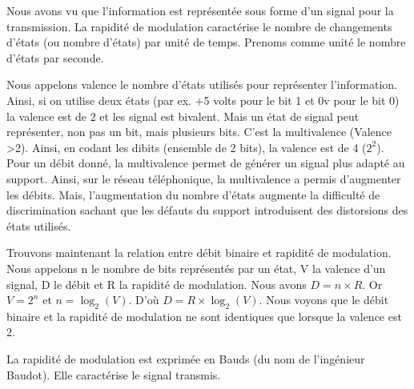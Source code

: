 Nous avons vu que l'information est représentée sous forme d'un signal pour la transmission.
La rapidité de modulation caractérise le nombre de changements d'états (ou nombre d'états) par
unité de temps. Prenoms comme unité le nombre d'états par seconde.

Nous appelons valence le nombre d'états utilisés pour représenter l'information. Ainsi, si on
utilise deux états (par ex. +5 volts pour le bit 1 et 0v pour le bit 0) la valence est de 2 et
les signal est bivalent. Mais un état de signal peut représenter, non pas un bit, mais
plusieurs bits. C'est la multivalence (Valence >2). Ainsi, en codant les dibits (ensemble de 2
bits), la valence est de 4 ($2^2$). Pour un débit donné, la multivalence permet de générer un
signal plus adapté au support. Ainsi, sur le réseau téléphonique, la multivalence a permis
d'augmenter les débits. Mais, l'augmentation du nombre d'états augmente la difficulté de
discrimination sachant que les défauts du support introduisent des distorsions des états
utilisés.

Trouvons maintenant la relation entre débit binaire et rapidité de modulation. Nous appelons n
le nombre de bits représentés par un état, V la valence d'un signal, D le débit et R la
rapidité de modulation. Nous avons $D=n\times R$. Or $V=2^n$ et $n=\log_2(V)$. D'où
$D=R\times\log_2(V)$. Nous voyons
que le débit binaire et la rapidité de modulation ne sont identiques que lorsque la valence
est 2.

La rapidité de modulation est exprimée en Bauds (du nom de l'ingénieur Baudot). Elle
caractérise le signal transmis.








